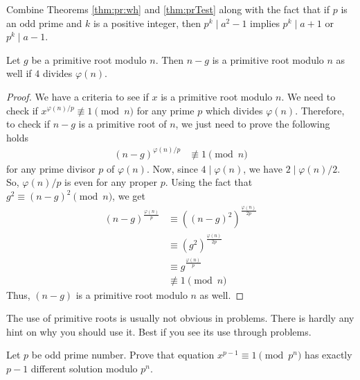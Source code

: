 \begin{hint}
	Combine Theorems \ref{thm:pr:wh} and \ref{thm:prTest} along with the fact that if $p$ is an odd prime and $k$ is a positive integer, then $p^k \mid a^2-1$ implies $p^k \mid a+1$ or $p^k\mid a-1$.
\end{hint}

\begin{theorem}
	Let $g$ be a primitive root modulo $n$. Then $n-g$ is a primitive root modulo $n$ as well if $4$ divides $\varphi(n)$.
\end{theorem}

\begin{proof}
	We have a criteria to see if $x$ is a primitive root modulo $n$. We need to check if $x^{{\varphi(n)}/{p}}\not\equiv1\pmod n$ for any prime $p$ which divides $\varphi(n)$. Therefore, to check if $n-g$ is a primitive root of $n$, we just need to prove the following holds
	\begin{align*}
		(n-g)^{{\varphi(n)}/{p}} & \not\equiv1\pmod n
	\end{align*}
	for any prime divisor $p$ of $\varphi(n)$. Now, since $4 \mid \varphi(n)$, we have $2 \mid {\varphi(n)}/{2}$. So, ${\varphi(n)}/{p}$ is even for any proper $p$. Using the fact that $g^2\equiv(n-g)^2\pmod n$, we get
	\begin{align*}
		(n-g)^\frac{\varphi(n)}{p}
			& \equiv\left((n-g)^2\right)^{\frac{\varphi(n)}{2p}}\\
			& \equiv \left(g^2\right)^{\frac{\varphi(n)}{2p}}\\
			& \equiv g^{\frac{\varphi(n)}{p}}\\
			& \not\equiv1\pmod n
	\end{align*}
	Thus, $(n-g)$ is a primitive root modulo $n$ as well.
\end{proof}
The use of primitive roots is usually not obvious in problems. There is hardly any hint on why you should use it. Best if you see its use through problems.
\begin{problem}
	Let $p$ be odd prime number. Prove that equation  $x^{p-1}\equiv 1 \pmod{p^n}$ has exactly $p -1$ different solution modulo $p^{n}$.
\end{problem}

